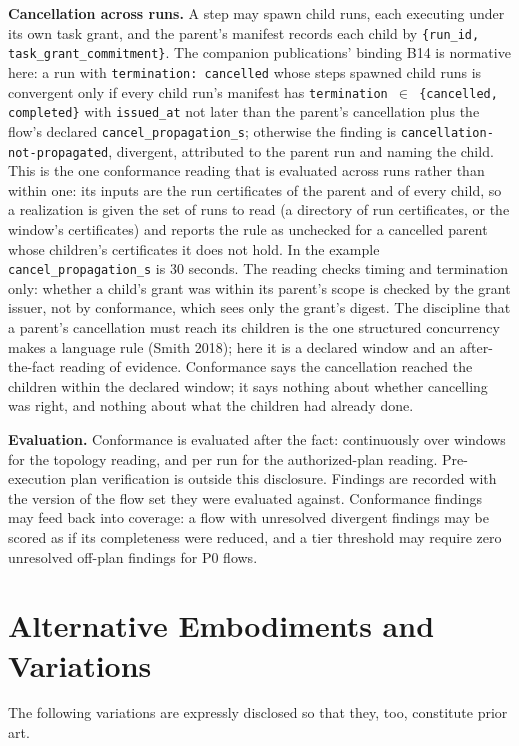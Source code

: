 \documentclass[11pt]{article}
\newcommand{\code}[1]{\texttt{#1}}
\begin{document}
\textbf{Cancellation across runs.} A step may spawn child runs, each executing under its own task grant, and the parent's manifest records each child by \code{\{run\_id, task\_grant\_commitment\}}. The companion publications' binding B14 is normative here: a run with \code{termination: cancelled} whose steps spawned child runs is convergent only if every child run's manifest has \code{termination \(\in\) \{cancelled, completed\}} with \code{issued\_at} not later than the parent's cancellation plus the flow's declared \code{cancel\_propagation\_s}; otherwise the finding is \code{cancellation-not-propagated}, divergent, attributed to the parent run and naming the child. This is the one conformance reading that is evaluated across runs rather than within one: its inputs are the run certificates of the parent and of every child, so a realization is given the set of runs to read (a directory of run certificates, or the window's certificates) and reports the rule as unchecked for a cancelled parent whose children's certificates it does not hold. In the example \code{cancel\_propagation\_s} is 30 seconds. The reading checks timing and termination only: whether a child's grant was within its parent's scope is checked by the grant issuer, not by conformance, which sees only the grant's digest. The discipline that a parent's cancellation must reach its children is the one structured concurrency makes a language rule (Smith 2018); here it is a declared window and an after-the-fact reading of evidence. Conformance says the cancellation reached the children within the declared window; it says nothing about whether cancelling was right, and nothing about what the children had already done.

\textbf{Evaluation.} Conformance is evaluated after the fact: continuously over windows for the topology reading, and per run for the authorized-plan reading. Pre-execution plan verification is outside this disclosure. Findings are recorded with the version of the flow set they were evaluated against. Conformance findings may feed back into coverage: a flow with unresolved divergent findings may be scored as if its completeness were reduced, and a tier threshold may require zero unresolved off-plan findings for P0 flows.

\section{Alternative Embodiments and Variations}
The following variations are expressly disclosed so that they, too, constitute prior art.
\end{document}
